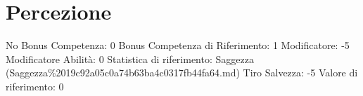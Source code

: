 \section{Percezione}\label{percezione}

\begin{description}
\tightlist
\item[Tags: ABI]
No Bonus Competenza: 0 Bonus Competenza di Riferimento: 1 Modificatore:
-5 Modificatore Abilità: 0 Statistica di riferimento: Saggezza
(Saggezza\%2019c92a05c0a74b63ba4c0317fb44fa64.md) Tiro Salvezza: -5
Valore di riferimento: 0
\end{description}
